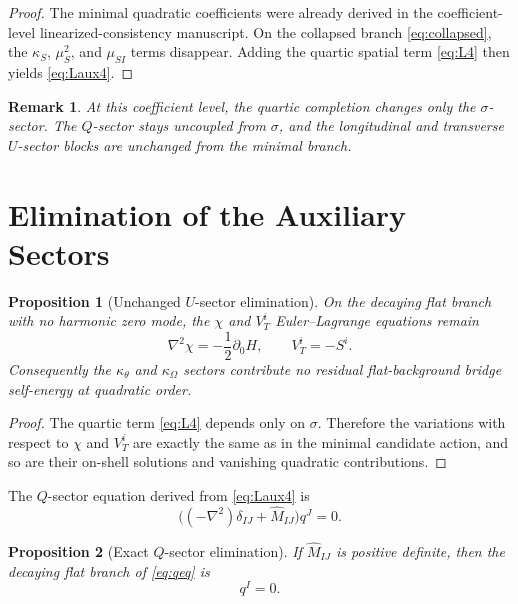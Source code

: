 \documentclass[11pt]{article}
\newtheorem{proposition}{Proposition}
\newtheorem{remark}{Remark}
\begin{document}
\begin{proof}
The minimal quadratic coefficients were already derived in the coefficient-level linearized-consistency manuscript. On the collapsed branch \eqref{eq:collapsed}, the \(\kappa_S\), \(\mu_S^2\), and \(\mu_{SI}\) terms disappear. Adding the quartic spatial term \eqref{eq:L4} then yields \eqref{eq:Laux4}.
\end{proof}

\begin{remark}
At this coefficient level, the quartic completion changes only the \(\sigma\)-sector. The \(Q\)-sector stays uncoupled from \(\sigma\), and the longitudinal and transverse \(U\)-sector blocks are unchanged from the minimal branch.
\end{remark}

\section{Elimination of the Auxiliary Sectors}

\begin{proposition}[Unchanged \(U\)-sector elimination]
On the decaying flat branch with no harmonic zero mode, the \(\chi\) and \(V_T^i\) Euler--Lagrange equations remain
\begin{equation}
\nabla^2\chi=-\frac{1}{2}\partial_0H,
\qquad
V_T^i=-S^i.
\label{eq:Usolve}
\end{equation}
Consequently the \(\kappa_\theta\) and \(\kappa_\Omega\) sectors contribute no residual flat-background bridge self-energy at quadratic order.
\end{proposition}

\begin{proof}
The quartic term \eqref{eq:L4} depends only on \(\sigma\). Therefore the variations with respect to \(\chi\) and \(V_T^i\) are exactly the same as in the minimal candidate action, and so are their on-shell solutions and vanishing quadratic contributions.
\end{proof}

The \(Q\)-sector equation derived from \eqref{eq:Laux4} is
\begin{equation}
\bigl((-\nabla^2)\delta_{IJ}+\widehat M_{IJ}\bigr)q^J=0.
\label{eq:qeq}
\end{equation}

\begin{proposition}[Exact \(Q\)-sector elimination]
If \(\widehat M_{IJ}\) is positive definite, then the decaying flat branch of \eqref{eq:qeq} is
\begin{equation}
q^I=0.
\label{eq:qzero}
\end{equation}
\end{proposition}
\end{document}
